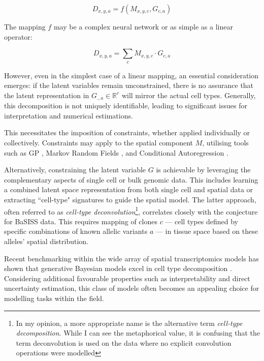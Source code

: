 \begin{equation}
    D_{x,y,a} = f(M_{x,y,c}, G_{c,a})
\end{equation}

The mapping $f$ may be a complex neural network \parencite{Dong2022-ty, Ma2022-pd} or as simple as a linear operator:

\begin{equation}
    D_{x,y,a} = \sum_{c} M_{x,y,c} \cdot G_{c,a}
\end{equation}

However, even in the simplest case of a linear mapping, an essential consideration emerges: if the latent variables remain unconstrained, there is no assurance that the latent representation in $G_{.,a} \in \mathbb{R} ^c$ will mirror the actual cell types. Generally, this decomposition is not uniquely identifiable, leading to significant issues for interpretation and numerical estimations.

This necessitates the imposition of constraints, whether applied individually or collectively. Constraints may apply to the spatial component $M$, utilising tools such as \acf{GP} \parencite{Townes2023-uj}, Markov Random Fields \parencite{Petukhov2022-pv}, and Conditional Autoregression \parencite{Ma2022-pd, Ni2022-tu}.

Alternatively, constraining the latent variable $G$ is achievable by leveraging the complementary aspects of single cell or bulk genomic data. This includes learning a combined latent space representation from both single cell and spatial data or extracting ``cell-type" signatures to guide the spatial model. The latter approach, often referred to as \emph{cell-type deconvolution}\footnote{In my opinion, a more appropriate name is the alternative term \emph{cell-type decomposition}. While I can see the metaphorical value, it is confusing that the term deconvolution is used on the data where no explicit convolution operations were modelled}, correlates closely with the conjecture for \ac{BaSISS} data. This requires mapping of clones $c$ — cell types defined by specific combinations of known allelic variants $a$ — in tissue space based on these alleles' spatial distribution.

Recent benchmarking within the wide array of spatial transcriptomics models has shown that generative Bayesian models excel in cell type decomposition \parencite{Li2023-ik}. Considering additional favourable properties such as interpretability and direct uncertainty estimation, this class of models often becomes an appealing choice for modelling tasks within the field.


